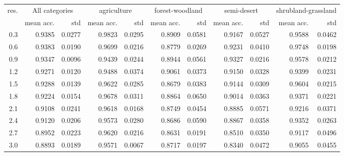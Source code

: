\begin{tabular}{rrrrrrrrrrr}
\toprule
res. & \multicolumn{2}{c}{All categories} & \multicolumn{2}{c}{agriculture} & \multicolumn{2}{c}{forest-woodland} & \multicolumn{2}{c}{semi-desert} & \multicolumn{2}{c}{shrubland-grassland} \\
           &     mean acc. &    std &                 mean acc. &    std &                     mean acc. &    std &                 mean acc. &    std &                         mean acc. &    std \\
\midrule
       0.3 &   0.9385 & 0.0277 &               0.9823 & 0.0295 &                   0.8909 & 0.0581 &               0.9167 & 0.0527 &                       0.9588 & 0.0462 \\
       0.6 &   0.9383 & 0.0190 &               0.9699 & 0.0216 &                   0.8779 & 0.0269 &               0.9231 & 0.0410 &                       0.9748 & 0.0198 \\
       0.9 &   0.9347 & 0.0096 &               0.9439 & 0.0244 &                   0.8944 & 0.0561 &               0.9327 & 0.0216 &                       0.9578 & 0.0212 \\
       1.2 &   0.9271 & 0.0120 &               0.9488 & 0.0374 &                   0.9061 & 0.0373 &               0.9150 & 0.0328 &                       0.9399 & 0.0231 \\
       1.5 &   0.9288 & 0.0139 &               0.9622 & 0.0285 &                   0.8679 & 0.0383 &               0.9144 & 0.0309 &                       0.9604 & 0.0215 \\
       1.8 &   0.9224 & 0.0154 &               0.9678 & 0.0311 &                   0.8864 & 0.0650 &               0.9014 & 0.0363 &                       0.9371 & 0.0221 \\
       2.1 &   0.9108 & 0.0241 &               0.9618 & 0.0168 &                   0.8749 & 0.0454 &               0.8885 & 0.0571 &                       0.9216 & 0.0371 \\
       2.4 &   0.9120 & 0.0206 &               0.9573 & 0.0280 &                   0.8686 & 0.0590 &               0.8867 & 0.0358 &                       0.9352 & 0.0263 \\
       2.7 &   0.8952 & 0.0223 &               0.9620 & 0.0216 &                   0.8631 & 0.0191 &               0.8510 & 0.0350 &                       0.9117 & 0.0496 \\
       3.0 &   0.8893 & 0.0189 &               0.9571 & 0.0067 &                   0.8717 & 0.0197 &               0.8340 & 0.0472 &                       0.9055 & 0.0455 \\

\end{tabular}
